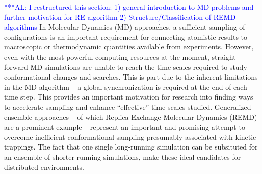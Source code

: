 \documentclass[times, 10pt, twocolumn]{article}
\newcommand{\alnote}[1]{ {\textcolor{blue} { ***AL: #1 }}}
\newcommand{\jhanote}[1]{ {\textcolor{red} { ***SJ: #1 }}}
\newcommand{\alnote}[1]{}
\newcommand{\jhanote}[1]{}
\newcommand{\up}{\vspace*{-1em}}
\begin{document}


\alnote{I restructured this section: 1) general introduction to MD
  problems and further motivation for RE algorithm 2)
  Structure/Classification of REMD algorithms} \up In Molecular
Dynamics (MD) approaches, a sufficient sampling of configurations is
an important requirement for connecting atomistic results to
macroscopic or thermodynamic quantities available from experiments.
However, even with the most powerful computing resources at the
moment, straight-forward MD simulations are unable to reach the
time-scales required to study conformational changes and
searches. This is part due to the inherent limitations in the MD
algorithm -- a global synchronization is required at the end of each
time step.  This provides an important motivation for research into
finding ways to accelerate sampling and enhance ``effective''
time-scales studied. Generalized ensemble approaches -- of which
Replica-Exchange Molecular Dynamics (REMD)~\cite{Sugita:1999rm} are a
prominent example -- represent an important and promising attempt to
overcome inefficient conformational sampling presumably associated
with kinetic trappings.  The fact that one single long-running
simulation can be subsituted for an ensemble of shorter-running
simulations, make these ideal candidates for distributed environments.

\end{document}
